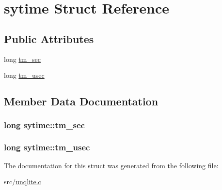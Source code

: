 \hypertarget{structsytime}{\section{sytime Struct Reference}
\label{dc/d7d/structsytime}
}
\subsection*{Public Attributes}
\begin{DoxyCompactItemize}
\item 
long \hyperlink{structsytime_aec4fe329ce7ca8b9784f3f891ccee1e1}{tm\-\_\-sec}
\item 
long \hyperlink{structsytime_af7e91ee4ed4966c6b8ad7576ee5596fd}{tm\-\_\-usec}
\end{DoxyCompactItemize}


\subsection{Member Data Documentation}
\hypertarget{structsytime_aec4fe329ce7ca8b9784f3f891ccee1e1}{
\subsubsection[{tm\-\_\-sec}]{\setlength{\rightskip}{0pt plus 5cm}long sytime\-::tm\-\_\-sec}}\label{dc/d7d/structsytime_aec4fe329ce7ca8b9784f3f891ccee1e1}
\hypertarget{structsytime_af7e91ee4ed4966c6b8ad7576ee5596fd}{
\subsubsection[{tm\-\_\-usec}]{\setlength{\rightskip}{0pt plus 5cm}long sytime\-::tm\-\_\-usec}}\label{dc/d7d/structsytime_af7e91ee4ed4966c6b8ad7576ee5596fd}


The documentation for this struct was generated from the following file\-:\begin{DoxyCompactItemize}
\item 
src/\hyperlink{unqlite_8c}{unqlite.\-c}\end{DoxyCompactItemize}
